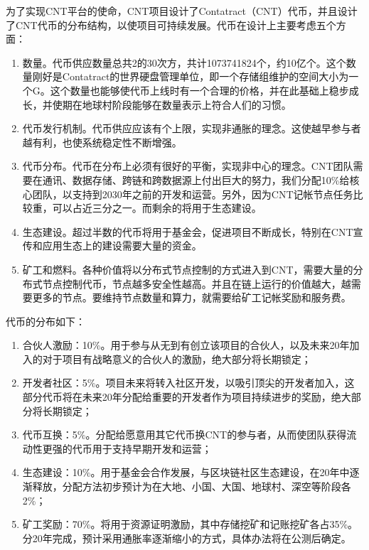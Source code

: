 \documentclass[a4paper,12pt]{article}
\begin{document}
为了实现CNT平台的使命，CNT项目设计了Contatract（CNT）代币，并且设计了CNT代币的分布结构，以使项目可持续发展。代币在设计上主要考虑五个方面：

\begin{enumerate}
\item 数量。代币供应数量总共2的30次方，共计1073741824个，约10亿个。这个数量刚好是Contatract的世界硬盘管理单位，即一个存储组维护的空间大小为一个G。这个数量也能够使代币上线时有一个合理的价格，并在此基础上稳步成长，并使期在地球村阶段能够在数量表示上符合人们的习惯。
\item 代币发行机制。代币供应应该有个上限，实现非通胀的理念。这使越早参与者越有利，也使系统稳定性不断增强。
\item 代币分布。代币在分布上必须有很好的平衡，实现非中心的理念。CNT团队需要在通讯、数据存储、跨链和跨数据源上付出巨大的努力，我们分配10\%给核心团队，以支持到2030年之前的开发和运营。另外，因为CNT记帐节点任务比较重，可以占近三分之一。而剩余的将用于生态建设。
\item 生态建设。超过半数的代币将用于基金会，促进项目不断成长，特别在CNT宣传和应用生态上的建设需要大量的资金。
\item 矿工和燃料。各种价值将以分布式节点控制的方式进入到CNT，需要大量的分布式节点控制代币，节点越多安全性越高。并且在链上运行的价值越大，越需要更多的节点。要维持节点数量和算力，就需要给矿工记帐奖励和服务费。

\end{enumerate}

代币的分布如下：

\begin{enumerate}
\item 合伙人激励：10\%。用于参与从无到有创立该项目的合伙人，以及未来20年加入的对于项目有战略意义的合伙人的激励，绝大部分将长期锁定；
\item 开发者社区：5\%。项目未来将转入社区开发，以吸引顶尖的开发者加入，这部分代币将在未来20年分配给重要的开发者作为项目持续进步的奖励，绝大部分将长期锁定；
\item 代币互换：5\%。分配给愿意用其它代币换CNT的参与者，从而使团队获得流动性更强的代币用于支持早期开发和运营；
\item 生态建设：10\%。用于基金会合作发展，与区块链社区生态建设，在20年中逐渐释放，分配方法初步预计为在大地、小国、大国、地球村、深空等阶段各2\%；
\item 矿工奖励：70\%。将用于资源证明激励，其中存储挖矿和记账挖矿各占35\%。分20年完成，预计采用通胀率逐渐缩小的方式，具体办法将在公测后确定。
\end{enumerate}
\end{document}
